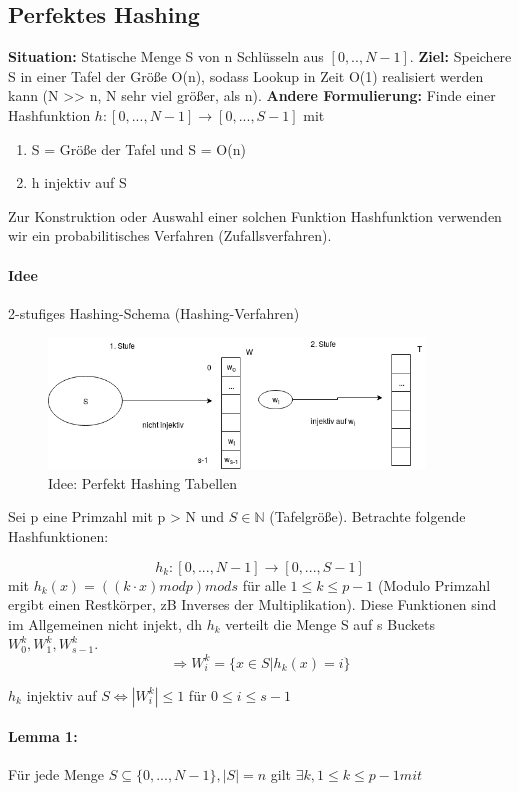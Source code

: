 \subsection{Perfektes Hashing}
\textbf{Situation:} Statische Menge  S von n Schlüsseln aus $ [0,..,N-1] $. \textbf{Ziel:} Speichere S in einer Tafel der Größe O(n), sodass Lookup in Zeit O(1) realisiert werden kann (N >> n, N sehr viel größer, als n). \textbf{Andere Formulierung:} Finde einer Hashfunktion $ h: [0,..., N-1] \rightarrow [0,...,S-1] $ mit 
\begin{enumerate}
    \item S = Größe der Tafel und S = O(n)
    \item h injektiv auf S
\end{enumerate}
Zur Konstruktion oder Auswahl einer solchen Funktion Hashfunktion verwenden wir ein probabilitisches Verfahren (Zufallsverfahren).
\paragraph{Idee} 2-stufiges Hashing-Schema (Hashing-Verfahren)
\begin{figure}[h]
    \begin{center}
        \includegraphics[width=10cm]{perfekthashing.png}
        \caption{Idee: Perfekt Hashing Tabellen}
        \label{fig:}
    \end{center}
\end{figure}

Sei p eine Primzahl mit p > N und $ S \in \mathbb{N} $ (Tafelgröße). Betrachte folgende Hashfunktionen:

$$ h_k:[0,...,N-1] \rightarrow [0,...,S-1] $$ mit $ h_k(x)= ((k \cdot x) mod p) mod s  $ für alle $ 1 \leq k \leq p-1 $ (Modulo Primzahl ergibt einen Restkörper, zB Inverses der Multiplikation). Diese Funktionen sind im Allgemeinen nicht injekt, dh $ h_k $ verteilt die Menge S auf s Buckets $ W_0^k, W_1^k, W_{s-1}^k $. 
$$ \Rightarrow W_i^k  = \{x\in S | h_k(x) = i\} $$

$ h_k $ injektiv auf $ S \Leftrightarrow |W_i^k| \leq 1 $ für $ 0 \leq i \leq s-1 $

\paragraph{Lemma 1: } Für jede Menge $ S \subseteq \{0,..., N-1 \}, |S| = n $ gilt $ \exists k, 1 \leq k \leq p-1 mit $

